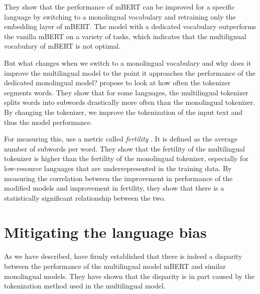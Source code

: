 They show that the performance of mBERT can be improved for a specific language by switching to a monolingual vocabulary and retraining only the embedding layer of mBERT. The model with a dedicated vocabulary outperforms the vanilla mBERT on a variety of tasks, which indicates that the multilignual vocabulary of mBERT is not optimal. 

But what changes when we switch to a monolingual vocabulary and why does it improve the multilingual model to the point it approaches the performance of the dedicated monolingual model? \citet{rust_how_2021} propose to look at how often the tokenizer segments words. They show that for some languages, the multilingual tokenizer splits words into subwords drastically more often than the monolingual tokenizer. By changing the tokenizer, we improve the tokenization of the input text and thus the model performance.

For measuring this, \citet{rust_how_2021} use a metric called \textit{fertility} \cite{acs_exploring_2019}. It is defined as the average number of subwords per word. They show that the fertility of the multilingual tokenizer is higher than the fertility of the monolingual tokenizer, especially for low-resource languages that are underrepresented in the training data. By measuring the correlation between the improvement in performance of the modified models and improvement in fertility, they show that there is a statistically significant relationship between the two.


\section{Mitigating the language bias}

As we have described, \citet{rust_how_2021} have firmly established that there is indeed a disparity between the performance of the multilingual model mBERT and similar monolingual models. They have shown that the disparity is in part caused by the tokenization method used in the multilingual model.

